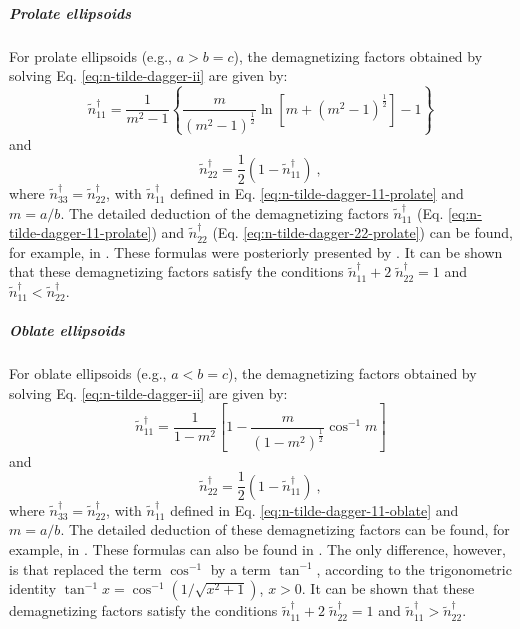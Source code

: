 \documentclass[gmd, manuscript]{copernicus}
\begin{document}
\subparagraph*{Prolate ellipsoids}


For prolate ellipsoids (e.g., $a > b = c$), the demagnetizing
factors obtained by solving Eq. \ref{eq:n-tilde-dagger-ii}
are given by:
\begin{equation}
\tilde{n}^{\dagger}_{11} = \frac{1}{m^{2} - 1}
\left\lbrace \frac{m}{\left( m^{2} - 1 \right)^{\frac{1}{2}}}
\ln \left[ m + \left( m^{2} - 1 \right)^{\frac{1}{2}} \right]
- 1 \right\rbrace
\label{eq:n-tilde-dagger-11-prolate}
\end{equation}
and
\begin{equation}
\tilde{n}^{\dagger}_{22} = \frac{1}{2} \left(1 - \tilde{n}^{\dagger}_{11} \right) \: ,
\label{eq:n-tilde-dagger-22-prolate}
\end{equation}
where $\tilde{n}^{\dagger}_{33} = \tilde{n}^{\dagger}_{22}$,
with $\tilde{n}^{\dagger}_{11}$ defined in
Eq. \ref{eq:n-tilde-dagger-11-prolate} and $m = a/b$.
The detailed deduction of the demagnetizing factors
$\tilde{n}^{\dagger}_{11}$ (Eq. \ref{eq:n-tilde-dagger-11-prolate})
and $\tilde{n}^{\dagger}_{22}$ (Eq. \ref{eq:n-tilde-dagger-22-prolate})
can be found, for example, in \citet{stoner1945}.
These formulas were posteriorly presented by \citet{emerson1985}.
It can be shown that these demagnetizing factors
satisfy the conditions
$\tilde{n}^{\dagger}_{11} + 2 \; \tilde{n}^{\dagger}_{22} = 1$
and
$\tilde{n}^{\dagger}_{11} < \tilde{n}^{\dagger}_{22}$.


\subparagraph*{Oblate ellipsoids}


For oblate ellipsoids (e.g., $a < b = c$), the demagnetizing
factors obtained by solving Eq. \ref{eq:n-tilde-dagger-ii}
are given by:
\begin{equation}
\tilde{n}^{\dagger}_{11} =
\frac{1}{1 - m^{2}} \left[
1 - \frac{m}{\left( 1 - m^{2} \right)^{\frac{1}{2}}} \cos^{-1}m
\right]
\label{eq:n-tilde-dagger-11-oblate}
\end{equation}
and
\begin{equation}
\tilde{n}^{\dagger}_{22} = \frac{1}{2} \left(1 - \tilde{n}^{\dagger}_{11} \right) \: ,
\label{eq:n-tilde-dagger-22-oblate}
\end{equation}
where $\tilde{n}^{\dagger}_{33} = \tilde{n}^{\dagger}_{22}$,
with $\tilde{n}^{\dagger}_{11}$ defined in
Eq. \ref{eq:n-tilde-dagger-11-oblate} and $m = a/b$.
The detailed deduction of these demagnetizing factors
can be found, for example, in \citet{stoner1945}.
These formulas can also be found in \citet{emerson1985}.
The only difference, however, is that \citet{emerson1985} replaced
the term $\cos^{-1}$ by a term $\tan^{-1}$, according to
the trigonometric identity
$\tan^{-1}x = \cos^{-1}(1/\sqrt{x^{2} + 1})$, $x > 0$.
It can be shown that these demagnetizing factors
satisfy the conditions
$\tilde{n}^{\dagger}_{11} + 2 \; \tilde{n}^{\dagger}_{22} = 1$
and
$\tilde{n}^{\dagger}_{11} > \tilde{n}^{\dagger}_{22}$.
\end{document}
